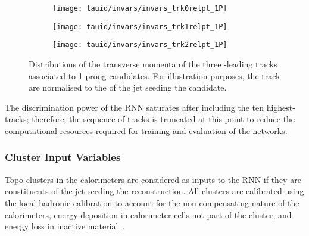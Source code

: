 \begin{figure}[htbp]
  \centering

  \begin{subfigure}{0.33\textwidth}
    \texttt{[image: tauid/invars/invars\_trk0relpt\_1P]}
    \subcaption{}%
    \label{fig:tauid_low_level_variables_track0}
  \end{subfigure}%
  \begin{subfigure}{0.33\textwidth}
    \texttt{[image: tauid/invars/invars\_trk1relpt\_1P]}
    \subcaption{}%
    \label{fig:tauid_low_level_variables_track1}
  \end{subfigure}%
  \begin{subfigure}{0.33\textwidth}
    \texttt{[image: tauid/invars/invars\_trk2relpt\_1P]}
    \subcaption{}%
    \label{fig:tauid_low_level_variables_track2}
  \end{subfigure}

  \caption[Distributions of the transverse momenta of the three \pT-leading
  tracks associated to 1-prong \tauhadvis candidates.]{Distributions of the
    transverse momenta of the three \pT-leading tracks associated to 1-prong
    \tauhadvis candidates. For illustration purposes, the track \pT are
    normalised to the \pT of the jet seeding the \tauhadvis candidate.}%
  \label{fig:tauid_low_level_variables_track}
\end{figure}

The discrimination power of the RNN \tauid saturates after including the ten
highest-\pT tracks; therefore, the sequence of tracks is truncated at this point
to reduce the computational resources required for training and evaluation of
the networks.


\subsubsection{Cluster Input Variables}

Topo-clusters in the calorimeters are considered as inputs to the RNN \tauid if
they are constituents of the jet seeding the \tauhadvis reconstruction. All
clusters are calibrated using the local hadronic calibration to account for the
non-compensating nature of the calorimeters, energy deposition in calorimeter
cells not part of the cluster, and energy loss in inactive
material~\cite{PERF-2014-07}.

